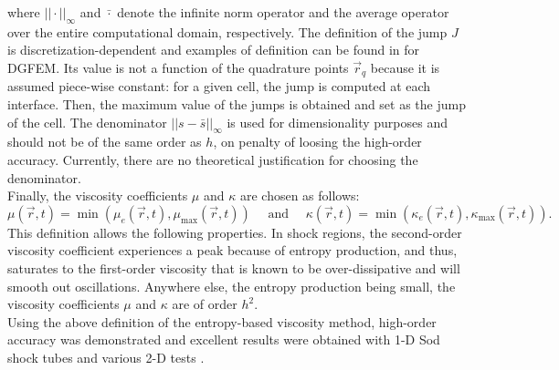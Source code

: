 \documentclass[preprint,10pt]{elsarticle}
\begin{document}
where $|| \cdot ||_{\infty}$ and $\bar{\cdot}$ denote the infinite norm operator and the average operator over the entire computational domain, respectively. The definition of the jump $J$ is discretization-dependent and examples of definition can be found in \cite{valentin} for DGFEM. Its value is not a function of the quadrature points $\vec{r}_q$ because it is assumed piece-wise constant: for a given cell, the jump is computed at each interface. Then, the maximum value of the jumps is obtained and set as the jump of the cell. The denominator $|| s - \bar{s} ||_{\infty}$ is used for dimensionality purposes and should not be of the same order as $h$, on penalty of loosing the high-order accuracy. Currently, there are no theoretical justification for choosing the denominator. \\
Finally, the viscosity coefficients $\mu$ and $\kappa$ are chosen as follows:
\begin{equation}
\mu(\vec{r},t) = \min\left( \mu_e(\vec{r},t), \mu_{\max}(\vec{r},t) \right) \quad \text{ and } \quad \kappa(\vec{r},t) = \min\left( \kappa_e(\vec{r},t), \kappa_{\max}(\vec{r},t) \right).
\end{equation}
This definition allows the following properties.
In shock regions, the second-order viscosity coefficient experiences a peak because of entropy production, and thus, saturates to the first-order viscosity that is known to be over-dissipative and will smooth out oscillations. Anywhere else, the entropy production being small, the viscosity coefficients $\mu$ and $\kappa$ are of order $h^2$.\\
Using the above definition of the entropy-based viscosity method, high-order accuracy was demonstrated and excellent results were obtained with 1-D Sod shock tubes and various 2-D tests \cite{jlg1, jlg2, valentin}.
\end{document}
